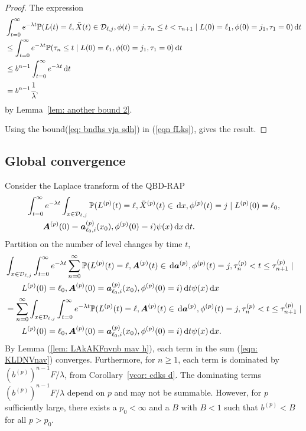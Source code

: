 \begin{proof}
	The expression 
	\begin{align}
		&\int_{t=0}^\infty e^{-\lambda t} \mathbb P(L(t) = \ell, \bar X(t)\in\mathcal D_{\ell,j}, \phi(t) = j, \tau_{n}\leq t<\tau_{n+1} \nonumber
		\mid L(0)=\ell_1,\phi(0)=j_1, \tau_1=0) \, \mathrm{d} t
		\\&\leq \int_{t=0}^\infty e^{-\lambda t} \mathbb P(\tau_{n}\leq t \nonumber
		\mid L(0)=\ell_1,\phi(0)=j_1, \tau_1=0) \, \mathrm{d} t
		\\&\leq b^{n-1}\int_{t=0}^\infty e^{-\lambda t} \, \mathrm{d} t \nonumber 
		\\&=b^{n-1}\cfrac{1}{\lambda}, \label{eq: bndhs vja sdh}
	\end{align}
	by Lemma~\ref{lem: another bound 2}.
	
	Using the bound(\ref{eq: bndhs vja sdh}) in (\ref{eqn fLks}), gives the result.  
\end{proof}

\subsection{Global convergence}
Consider the Laplace transform of the QBD-RAP 
\begin{align}
	&\int_{t=0}^\infty e^{-\lambda t}\int_{x\in\mathcal D_{\ell,j}}\mathbb P(L^{(p)}(t) = \ell, \bar X^{(p)}(t) \in \, \mathrm{d} x, \phi^{(p)}(t) = j \mid L^{(p)}(0)=\ell_0, \nonumber 
	\\&\qquad{} \boldsymbol A^{(p)}(0)=\boldsymbol  a_{\ell_0,i}^{(p)}(x_0), \phi^{(p)}(0)=i)  \psi(x)\, \mathrm{d} x\, \mathrm{d} t.
\end{align}
Partition on the number of level changes by time \(t\), 
\begin{align}
	&\int_{x\in\mathcal D_{\ell,j}} \int_{t=0}^\infty e^{-\lambda t}\sum_{n=0}^\infty \mathbb P(L^{(p)}(t) = \ell, \boldsymbol A^{(p)}(t) \in \, \mathrm{d} \boldsymbol a^{(p)}, \phi^{(p)}(t) = j, \tau_{n}^{(p)}< t \leq\tau_{n+1}^{(p)} \mid\nonumber 
	\\&\qquad{} L^{(p)}(0)=\ell_0, \boldsymbol A^{(p)}(0)=\boldsymbol  a_{\ell_0,i}^{(p)}(x_0), \phi^{(p)}(0)=i)\, \mathrm{d} t \psi(x)\, \mathrm{d} x \nonumber
	\\&=\sum_{n=0}^\infty\int_{x\in\mathcal D_{\ell,j}}\int_{t=0}^\infty e^{-\lambda t} \mathbb P(L^{(p)}(t) = \ell, \boldsymbol A^{(p)}(t) \in \, \mathrm{d} \boldsymbol a^{(p)}, \phi^{(p)}(t) = j, \tau_{n}^{(p)}< t \leq\tau_{n+1}^{(p)} \mid \nonumber 
	\\&\qquad{}L^{(p)}(0)=\ell_0, \boldsymbol A^{(p)}(0)=\boldsymbol  a_{\ell_0,i}^{(p)}(x_0), \phi^{(p)}(0)=i)\, \mathrm{d} t \psi(x) \, \mathrm{d} x. \label{eqn: KLDNVnav}
\end{align}
By Lemma (\ref{lem: LAkAKFnvnb mav h}), each term in the sum (\ref{eqn: KLDNVnav}) converges. Furthermore, for \(n\geq 1\), each term is dominated by \(\left(b^{(p)}\right)^{n-1}F/\lambda\), from Corollary~\ref{vcor: cdks d}. The dominating terms \(\left(b^{(p)}\right)^{n-1}F/\lambda\) depend on \(p\) and may not be summable. However, for \(p\) sufficiently large, there exists a \(p_0<\infty\) and a \(B\) with \(B<1\) such that \(b^{(p)}<B\) for all \(p>p_0\). 

